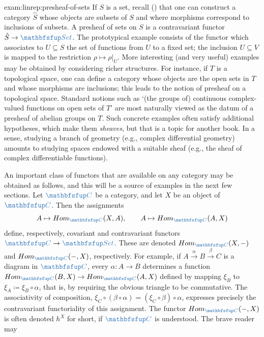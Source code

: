 \begin{exam}{}{exam:linrep:presheaf-of-sets}
  If $S$ is a set, recall ()
  that one can construct a category $\hat{S}$ whose objects are
  subsets of $S$ and where morphisms correspond to inclusions of
  subsets. A presheaf of sets on $S$ is a contravariant functor
  $\hat{S} \to \categ{Set}$. The prototypical example consists of the
  functor which associates to $U \subseteq S$ the set of functions
  from $U$ to a fixed set; the inclusion $U \subseteq V$ is mapped to
  the restriction $\rho \mapsto \rho|_U$. More interesting (and very
  useful) examples may be obtained by considering richer
  structures. For instance, if $T$ is a topological space, one can
  define a category whose objects are the open sets in $T$ and whose
  morphisms are inclusions; this leads to the notion of presheaf on a
  topological space. Standard notions such as `(the groups of)
  continuous complex-valued functions on open sets of $T$' are most
  naturally viewed as the datum of a presheaf of abelian groups on
  $T$. Such concrete examples often satisfy additional hypotheses,
  which make them \emph{sheaves}, but that is a topic for another
  book. In a sense, studying a branch of geometry (e.g., complex
  differential geometry) amounts to studying spaces endowed with a
  suitable sheaf (e.g., the sheaf of complex differentiable
  functions).
\end{exam}
An important class of functors that are available on any category may
be obtained as follows, and this will be a source of examples in the
next few sections. Let $\categ{C}$ be a category, and let $X$ be an
object of $\categ{C}$. Then the assignments
\[
  A \mapsto \Hom_{\categ{C}}(X, A), \qquad A \mapsto
  \Hom_{\categ{C}}(A, X)
\]
define, respectively, covariant and contravariant functors
$\categ{C} \to \categ{Set}$. These are denoted
$\Hom_{\categ{C}}(X, -)$ and $\Hom_{\categ{C}}(-, X)$,
respectively. For example, if
$A \xrightarrow{\alpha} B \xrightarrow{\beta} C$ is a diagram in
$\categ{C}$, every $\alpha : A \to B$ determines a function
$\Hom_{\categ{C}}(B, X) \to \Hom_{\categ{C}}(A, X)$ defined by mapping
$\xi_B$ to $\xi_A \coloneq \xi_B \circ \alpha$, that is, by requiring
the obvious triangle to be commutative. The associativity of
composition,
$\xi_C \circ (\beta \circ \alpha) = (\xi_C \circ \beta) \circ \alpha$,
expresses precisely the contravariant functoriality of this
assignment.  The functor $\Hom_{\categ{C}}(-, X)$ is often denoted
$h^X$ for short, if $\categ{C}$ is understood.  The brave reader may
